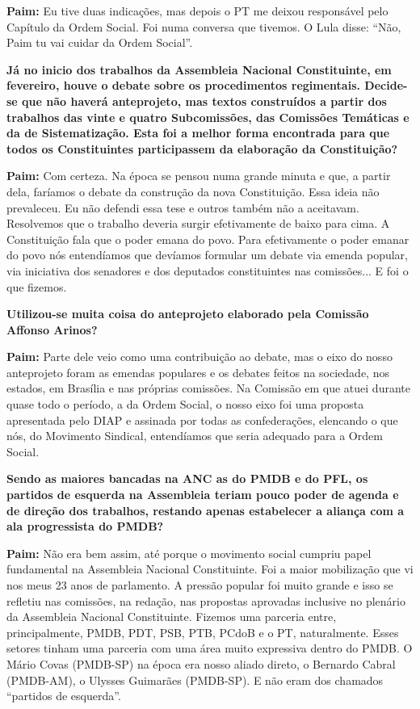 \textbf{Paim:} Eu tive duas indicações, mas depois o PT me deixou
responsável pelo Capítulo da Ordem Social. Foi numa conversa que
tivemos. O Lula disse: ``Não, Paim tu vai cuidar da Ordem Social''.

\textbf{Já no inicio dos trabalhos da Assembleia Nacional Constituinte,
em fevereiro, houve o debate sobre os procedimentos regimentais.
Decide-se que não haverá anteprojeto, mas textos construídos a partir
dos trabalhos das vinte e quatro Subcomissões, das Comissões Temáticas e
da de Sistematização. Esta foi a melhor forma encontrada para que todos
os Constituintes participassem da elaboração da Constituição?}

\textbf{Paim:} Com certeza. Na época se pensou numa grande minuta e que,
a partir dela, faríamos o debate da construção da nova Constituição.
Essa ideia não prevaleceu. Eu não defendi essa tese e outros também não
a aceitavam. Resolvemos que o trabalho deveria surgir efetivamente de
baixo para cima. A Constituição fala que o poder emana do povo. Para
efetivamente o poder emanar do povo nós entendíamos que devíamos
formular um debate via emenda popular, via iniciativa dos senadores e
dos deputados constituintes nas comissões... E foi o que fizemos.

\textbf{Utilizou-se muita coisa do anteprojeto elaborado pela Comissão
Affonso Arinos?}

\textbf{Paim:} Parte dele veio como uma contribuição ao debate, mas o
eixo do nosso anteprojeto foram as emendas populares e os debates feitos
na sociedade, nos estados, em Brasília e nas próprias comissões. Na
Comissão em que atuei durante quase todo o período, a da Ordem Social, o
nosso eixo foi uma proposta apresentada pelo DIAP e assinada por todas
as confederações, elencando o que nós, do Movimento Sindical,
entendíamos que seria adequado para a Ordem Social.

\textbf{Sendo as maiores bancadas na ANC as do PMDB e do PFL, os
partidos de esquerda na Assembleia teriam pouco poder de agenda e de
direção dos trabalhos, restando apenas estabelecer a aliança com a ala
progressista do PMDB? }

\textbf{Paim:} Não era bem assim, até porque o movimento social cumpriu
papel fundamental na Assembleia Nacional Constituinte. Foi a maior
mobilização que vi nos meus 23 anos de parlamento. A pressão popular foi
muito grande e isso se refletiu nas comissões, na redação, nas propostas
aprovadas inclusive no plenário da Assembleia Nacional Constituinte.
Fizemos uma parceria entre, principalmente, PMDB, PDT, PSB, PTB, PCdoB e
o PT, naturalmente. Esses setores tinham uma parceria com uma área muito
expressiva dentro do PMDB. O Mário Covas (PMDB-SP) na época era nosso
aliado direto, o Bernardo Cabral (PMDB-AM), o Ulysses Guimarães
(PMDB-SP). E não eram dos chamados ``partidos de esquerda''.

